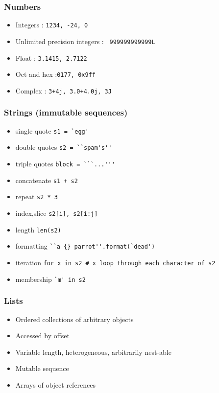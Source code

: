 \begin{frame}[fragile]\frametitle{Numbers}
  \begin{itemize}
  \item Integers : \lstinline{1234, -24, 0}
  \item Unlimited precision integers : \lstinline{ 999999999999L}
  \item Float : \lstinline{3.1415, 2.7122}
   \item Oct and hex :\lstinline|0177, 0x9ff|
  \item Complex : \lstinline{3+4j, 3.0+4.0j, 3J}
  \end{itemize}
\end{frame}

\begin{frame}[fragile]\frametitle{Strings (immutable sequences)}
  \begin{itemize}
  \item single quote \lstinline{s1 = `egg'}
\item double quotes \lstinline{s2 = ``spam's''}
\item triple quotes \lstinline{block = ```...'''}
\item concatenate \lstinline{s1 + s2}
\item repeat \lstinline{s2 * 3}
\item index,slice \lstinline{s2[i], s2[i:j]}
\item length \lstinline{len(s2)}
\item formatting \lstinline|``a {} parrot''.format(`dead')|
\item iteration \lstinline{for x in s2 # x loop through each character of s2}
\item membership \lstinline{`m' in s2}
  \end{itemize}
\end{frame}

\begin{frame}[fragile]\frametitle{Lists}
  \begin{itemize}
  \item Ordered collections of arbitrary objects
  \item Accessed by offset
  \item Variable length, heterogeneous, arbitrarily nest-able
  \item Mutable sequence
  \item Arrays of object references
  \end{itemize}
\end{frame}

